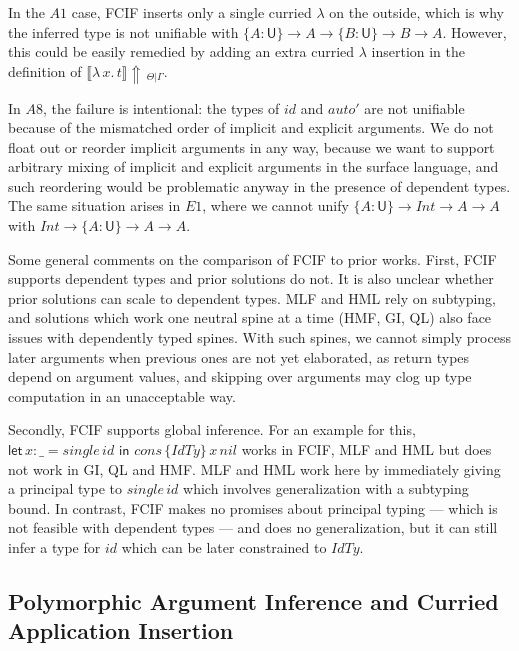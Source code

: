 \documentclass[acmsmall,review,anonymous,prologue,dvipsnames]{acmart}\settopmatter{printfolios=true,printccs=false,printacmref=false}
\newcommand{\slet}{\boldsymbol{\mathsf{let}}}
\renewcommand{\sin}{\boldsymbol{\mathsf{in}}}
\renewcommand{\U}{\mathsf{U}}
\newcommand{\mi}[1]{\mathit{#1}}
\newcommand{\einfer}[3]{\llbracket#1\rrbracket\!\Uparrow\,_{#2|#3}}
\theoremstyle{remark}
\begin{document}
In the $A1$ case, FCIF inserts only a single curried $\lambda$ on the outside,
which is why the inferred type is not unifiable with $\{A : \U\}\to A \to \{B :
\U\} \to B \to A$. However, this could be easily remedied by adding an extra
curried $\lambda$ insertion in the definition of
$\einfer{\lambda\,x.\,t}{\Theta}{\Gamma}$.

In $A8$, the failure is intentional: the types of $id$ and $auto'$ are not
unifiable because of the mismatched order of implicit and explicit arguments. We
do not float out or reorder implicit arguments in any way, because we want to
support arbitrary mixing of implicit and explicit arguments in the surface
language, and such reordering would be problematic anyway in the presence of
dependent types. The same situation arises in $E1$, where we cannot unify $\{A :
\U\}\to \mi{Int} \to A \to A$ with $\mi{Int} \to \{A : \U\}\to A \to A$.

Some general comments on the comparison of FCIF to prior works. First, FCIF
supports dependent types and prior solutions do not. It is also unclear whether
prior solutions can scale to dependent types. MLF and HML rely on subtyping, and
solutions which work one neutral spine at a time (HMF, GI, QL) also face issues
with dependently typed spines. With such spines, we cannot simply process later
arguments when previous ones are not yet elaborated, as return types depend on
argument values, and skipping over arguments may clog up type computation in an
unacceptable way.

Secondly, FCIF supports global inference. For an example for this, $\slet\,x :
\_ = \mi{single}\,\mi{id}\,\,\sin$ $\mi{cons}\,\{\mi{IdTy}\}\,x\,\mi{nil}$ works
in FCIF, MLF and HML but does not work in GI, QL and HMF. MLF and HML work here
by immediately giving a principal type to $\mi{single}\,\mi{id}$ which involves
generalization with a subtyping bound. In contrast, FCIF makes no promises about
principal typing --- which is not feasible with dependent types --- and does no
generalization, but it can still infer a type for $\mi{id}$ which can be later
constrained to $\mi{IdTy}$.

\subsection{Polymorphic Argument Inference and Curried Application Insertion}
\label{sec:appinsert}
\end{document}

